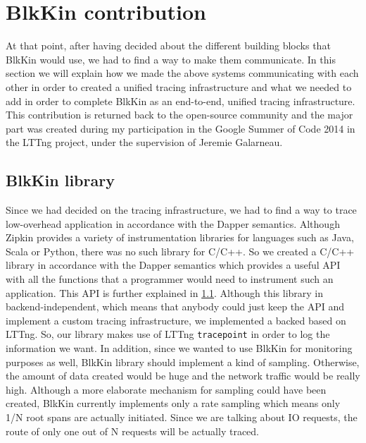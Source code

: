 \section{BlkKin contribution}\label{sec:contribution}

At that point, after having decided about the different building blocks that
BlkKin would use, we had to find a way to make them communicate. In this section
we will explain how we made the above systems communicating with each other in
order to created a unified tracing infrastructure and what we needed to add in
order to complete BlkKin as an end-to-end, unified tracing infrastructure. This
contribution is returned back to the open-source community and the major part
was created during my participation in the Google Summer of Code 2014 in the
LTTng project, under the supervision of Jeremie Galarneau.

\subsection{BlkKin library}
Since we had decided on the tracing infrastructure, we had to find a way to
trace low-overhead application in accordance with the Dapper semantics. Although
Zipkin provides a variety of instrumentation libraries for languages such as
Java, Scala or Python, there was no such library for C/C++. So we created a
C/C++ library in accordance with the Dapper semantics which provides a useful
API with all the functions that a programmer would need to instrument such an
application. This API is further explained in \ref{}. Although this library in
backend-independent, which means that anybody could just keep the API and
implement a custom tracing infrastructure, we implemented a backed based on
LTTng. So, our library makes use of LTTng \texttt{tracepoint} in order to log
the information we want. In addition, since we wanted to use BlkKin for
monitoring purposes as well, BlkKin library should implement a kind of sampling.
Otherwise, the amount of data created would be huge and the network traffic
would be really high. Although a more elaborate mechanism for sampling could
have been created, BlkKin currently implements only a rate sampling which means
only 1/N root spans are actually initiated. Since we are talking about IO
requests, the route of only one out of N requests will be actually traced.

